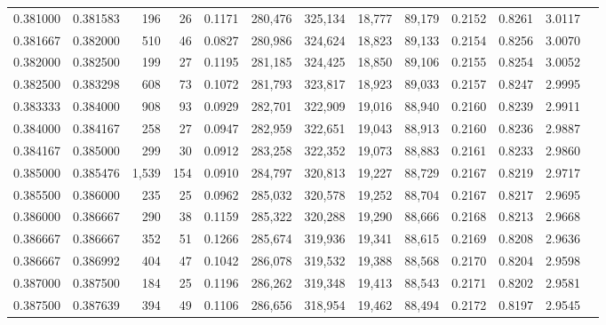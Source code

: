 \begin{tabular}{rrrrrrrrrrrrr}
0.381000 & 0.381583 &   196 &  26 &                                     0.1171 & 280,476 & 325,134 &  18,777 &  89,179 & 0.2152 & 0.8261 & 3.0117 \\
0.381667 & 0.382000 &   510 &  46 &                                     0.0827 & 280,986 & 324,624 &  18,823 &  89,133 & 0.2154 & 0.8256 & 3.0070 \\
0.382000 & 0.382500 &   199 &  27 &                                     0.1195 & 281,185 & 324,425 &  18,850 &  89,106 & 0.2155 & 0.8254 & 3.0052 \\
0.382500 & 0.383298 &   608 &  73 &                                     0.1072 & 281,793 & 323,817 &  18,923 &  89,033 & 0.2157 & 0.8247 & 2.9995 \\
0.383333 & 0.384000 &   908 &  93 &                                     0.0929 & 282,701 & 322,909 &  19,016 &  88,940 & 0.2160 & 0.8239 & 2.9911 \\
0.384000 & 0.384167 &   258 &  27 &                                     0.0947 & 282,959 & 322,651 &  19,043 &  88,913 & 0.2160 & 0.8236 & 2.9887 \\
0.384167 & 0.385000 &   299 &  30 &                                     0.0912 & 283,258 & 322,352 &  19,073 &  88,883 & 0.2161 & 0.8233 & 2.9860 \\
0.385000 & 0.385476 & 1,539 & 154 &                                     0.0910 & 284,797 & 320,813 &  19,227 &  88,729 & 0.2167 & 0.8219 & 2.9717 \\
0.385500 & 0.386000 &   235 &  25 &                                     0.0962 & 285,032 & 320,578 &  19,252 &  88,704 & 0.2167 & 0.8217 & 2.9695 \\
0.386000 & 0.386667 &   290 &  38 &                                     0.1159 & 285,322 & 320,288 &  19,290 &  88,666 & 0.2168 & 0.8213 & 2.9668 \\
0.386667 & 0.386667 &   352 &  51 &                                     0.1266 & 285,674 & 319,936 &  19,341 &  88,615 & 0.2169 & 0.8208 & 2.9636 \\
0.386667 & 0.386992 &   404 &  47 &                                     0.1042 & 286,078 & 319,532 &  19,388 &  88,568 & 0.2170 & 0.8204 & 2.9598 \\
0.387000 & 0.387500 &   184 &  25 &                                     0.1196 & 286,262 & 319,348 &  19,413 &  88,543 & 0.2171 & 0.8202 & 2.9581 \\
0.387500 & 0.387639 &   394 &  49 &                                     0.1106 & 286,656 & 318,954 &  19,462 &  88,494 & 0.2172 & 0.8197 & 2.9545 \\

\end{tabular}
